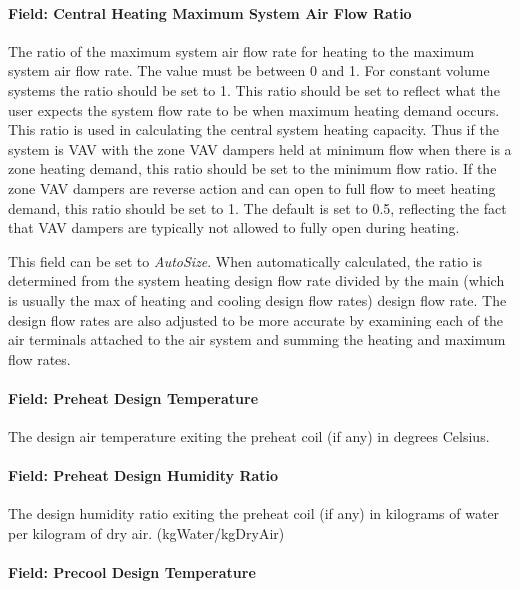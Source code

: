 \paragraph{Field: Central Heating Maximum System Air Flow Ratio}\label{field-central-heating-maximum-system-air-flow-ratio}

The ratio of the maximum system air flow rate for heating to the maximum system air flow rate. The value must be between 0 and 1. For constant volume systems the ratio should be set to 1. This ratio should be set to reflect what the user expects the system flow rate to be when maximum heating demand occurs. This ratio is used in calculating the central system heating capacity. Thus if the system is VAV with the zone VAV dampers held at minimum flow when there is a zone heating demand, this ratio should be set to the minimum flow ratio. If the zone VAV dampers are reverse action and can open to full flow to meet heating demand, this ratio should be set to 1. The default is set to 0.5, reflecting the fact that VAV dampers are typically not allowed to fully open during heating.

This field can be set to \emph{AutoSize}.  When automatically calculated, the ratio is determined from the system heating design flow rate divided by the main (which is usually the max of heating and cooling design flow rates) design flow rate.  The design flow rates are also adjusted to be more accurate by examining each of the air terminals attached to the air system and summing the heating and maximum flow rates.

\paragraph{Field: Preheat Design Temperature}\label{field-preheat-design-temperature}

The design air temperature exiting the preheat coil (if any) in degrees Celsius.

\paragraph{Field: Preheat Design Humidity Ratio}\label{field-preheat-design-humidity-ratio}

The design humidity ratio exiting the preheat coil (if any) in kilograms of water per kilogram of dry air. (kgWater/kgDryAir)

\paragraph{Field: Precool Design Temperature}\label{field-precool-design-temperature}

